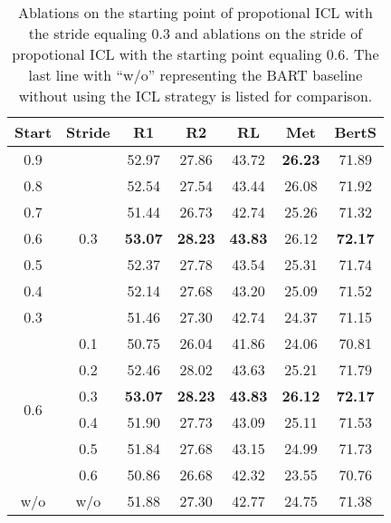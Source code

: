 
\begin{table}[t]
	\scriptsize
	\centering
	\begin{tabular}{ccccccc}
		\hline
		{Start} & {Stride}& {R1} & {R2} & {RL} & {Met} & {BertS} \\
		\hline
		0.9 &\multirow{7}{*}{0.3}& 52.97 & 27.86 & {43.72} & \textbf{26.23} & 71.89 \\
		0.8 & &52.54 & 27.54 & 43.44 & 26.08 & 71.92 \\
		0.7 & &51.44 & 26.73 & 42.74 & 25.26 & 71.32 \\
		0.6 & &\textbf{53.07} & \textbf{28.23} & \textbf{43.83} & 26.12 & \textbf{72.17}\\
		0.5 & &52.37 & 27.78 & 43.54 & 25.31 & 71.74 \\
		0.4 & &52.14 & 27.68 & 43.20 & 25.09 & 71.52 \\
		0.3 & &51.46 & 27.30 & 42.74 & 24.37 & 71.15\\
		\hline
		\multirow{6}{*}{0.6}&0.1  & 50.75 & 26.04 & 41.86 & 24.06 & 70.81\\
		&0.2 & 52.46 & 28.02 & 43.63 & 25.21 & 71.79\\
		&0.3 & \textbf{53.07} & \textbf{28.23} & \textbf{43.83} & \textbf{26.12} & \textbf{72.17} \\
		&0.4 & 51.90 & 27.73 & 43.09 & 25.11 & 71.53\\
		&0.5 & 51.84 & 27.68 & 43.15 & 24.99 &71.73\\
		&0.6 & 50.86 & 26.68 & 42.32 & 23.55 &70.76\\
		\hline
		w/o & w/o &51.88 & 27.30 & 42.77 & 24.75 & 71.38 \\
		\hline
	\end{tabular}
	\caption{Ablations on the starting point of propotional ICL with the stride equaling 0.3 and ablations on the stride of propotional ICL with the starting point equaling 0.6. The last line with ``w/o'' representing the BART baseline without using the ICL strategy is listed for comparison.}
	\label{tab:ablstart}
\end{table}

